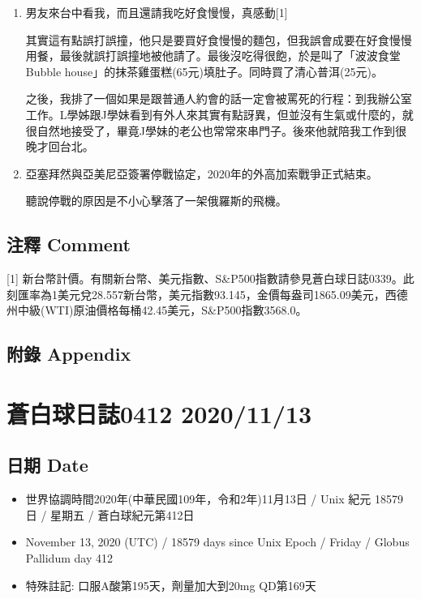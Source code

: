 \documentclass[a5paper, 11pt
]{book}
\providecommand{\tightlist}{%
  \setlength{\itemsep}{0pt}\setlength{\parskip}{0pt}}
\begin{document}
\begin{enumerate}
\def\labelenumi{\arabic{enumi}.}
\item
  男友來台中看我，而且還請我吃好食慢慢，真感動{[}1{]}

  其實這有點誤打誤撞，他只是要買好食慢慢的麵包，但我誤會成要在好食慢慢用餐，最後就誤打誤撞地被他請了。最後沒吃得很飽，於是叫了「波波食堂Bubble
  house」的抹茶雞蛋糕(65元)填肚子。同時買了清心普洱(25元)。

  之後，我排了一個如果是跟普通人約會的話一定會被罵死的行程：到我辦公室工作。L學姊跟J學妹看到有外人來其實有點訝異，但並沒有生氣或什麼的，就很自然地接受了，畢竟J學妹的老公也常常來串門子。後來他就陪我工作到很晚才回台北。
\item
  亞塞拜然與亞美尼亞簽署停戰協定，2020年的外高加索戰爭正式結束。

  聽說停戰的原因是不小心擊落了一架俄羅斯的飛機。
\end{enumerate}

\hypertarget{ux6ce8ux91cb-comment-66}{%
\subsection{注釋 Comment}\label{ux6ce8ux91cb-comment-66}}

{[}1{]}
新台幣計價。有關新台幣、美元指數、S\&P500指數請參見蒼白球日誌0339。此刻匯率為1美元兌28.557新台幣，美元指數93.145，金價每盎司1865.09美元，西德州中級(WTI)原油價格每桶42.45美元，S\&P500指數3568.0。

\hypertarget{ux9644ux9304-appendix-66}{%
\subsection{附錄 Appendix}\label{ux9644ux9304-appendix-66}}

\hypertarget{ux84bcux767dux7403ux65e5ux8a8c0412-20201113}{%
\section{蒼白球日誌0412
2020/11/13}\label{ux84bcux767dux7403ux65e5ux8a8c0412-20201113}}

\hypertarget{ux65e5ux671f-date-67}{%
\subsection{日期 Date}\label{ux65e5ux671f-date-67}}

\begin{itemize}
\tightlist
\item
  世界協調時間2020年(中華民國109年，令和2年)11月13日 / Unix 紀元 18579
  日 / 星期五 / 蒼白球紀元第412日
\item
  November 13, 2020 (UTC) / 18579 days since Unix Epoch / Friday /
  Globus Pallidum day 412
\item
  特殊註記: 口服A酸第195天，劑量加大到20mg QD第169天
\end{itemize}
\end{document}
